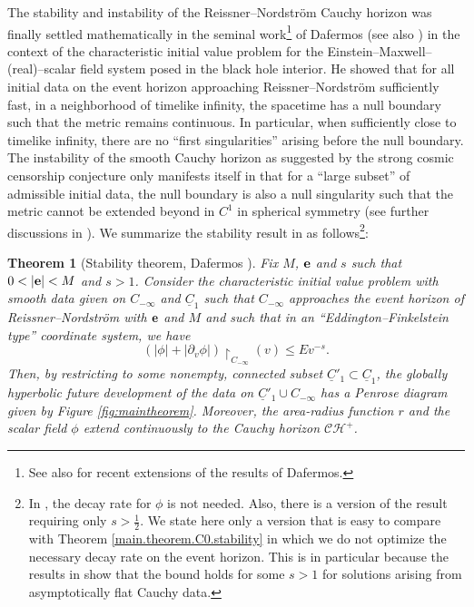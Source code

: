 \documentclass[10pt, reqno]{amsart}
\newtheorem{theorem}{Theorem}[section]
\theoremstyle{definition}
\theoremstyle{remark}
\numberwithin{equation}{section}
\newcommand{\rd}{\partial}
\newcommand{\0}{\emptyset}
\newcommand{\f}{\frac}
\begin{document}
The stability and instability of the Reissner--Nordstr\"om Cauchy horizon was finally settled mathematically in the seminal work\footnote{See also \cite{CGNS2, CGNS3 ,KomThe} for recent extensions of the results of Dafermos.} of Dafermos \cite{D2} (see also \cite{D1}) in the context of the characteristic initial value problem for the Einstein--Maxwell--(real)--scalar field system posed in the black hole interior. He showed that for all initial data on the event horizon approaching Reissner--Nordstr\"om sufficiently fast, in a neighborhood of timelike infinity, the spacetime has a null boundary such that the metric remains continuous. In particular, when sufficiently close to timelike infinity, there are no ``first singularities'' arising before the null boundary. The instability of the smooth Cauchy horizon as suggested by the strong cosmic censorship conjecture only manifests itself in that for a ``large subset'' of admissible initial data, the null boundary is also a null singularity such that the metric cannot be extended beyond in $C^1$ in spherical symmetry (see further discussions in \cite{D2}). We summarize the stability result in \cite{D2} as follows\footnote{In \cite{D2}, the decay rate for $\phi$ is not needed. Also, there is a version of the result requiring only $s>\f 12$. We state here only a version that is easy to compare with Theorem \ref{main.theorem.C0.stability} in which we do not optimize the necessary decay rate on the event horizon. This is in particular because the results in \cite{DRPL} show that the bound holds for some $s>1$ for solutions arising from asymptotically flat Cauchy data.}:
\begin{theorem}[Stability theorem, Dafermos \cite{D2}]\label{Dafermos.thm}
Fix $M$, ${\bf e}$ and $s$ such that $0<|{\bf e}|<M$ and $s>1$. Consider the characteristic initial value problem with smooth data given on $C_{-\infty}$ and $\underline{C}_1$ such that $C_{-\infty}$ approaches the event horizon of Reissner--Nordstr\"om with ${\bf e}$ and $M$ and such that in an ``Eddington--Finkelstein type'' coordinate system, we have
$$(|\phi|+|\rd_v\phi|)\restriction_{C_{-\infty}}(v)\leq E v^{-s}.$$
Then, by restricting to some nonempty, connected subset $\underline{C}'_1\subset \underline{C}_1$, the globally hyperbolic future development of the data on $\underline{C}'_1\cup C_{-\infty}$ has a Penrose diagram given by Figure \ref{fig:maintheorem}.
Moreover, the area-radius function $r$ and the scalar field $\phi$ extend continuously to the Cauchy horizon $\mathcal C\mathcal H^+$.
\end{theorem}
\end{document}
